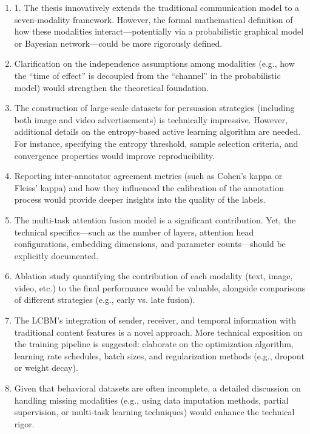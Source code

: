 
\begin{enumerate}
    \item 1. The thesis innovatively extends the traditional communication model to a seven-modality framework. However, the formal mathematical definition of how these modalities interact—potentially via a probabilistic graphical model or Bayesian network—could be more rigorously defined.

\item Clarification on the independence assumptions among modalities (e.g., how the “time of effect” is decoupled from the “channel” in the probabilistic model) would strengthen the theoretical foundation.

\item The construction of large-scale datasets for persuasion strategies (including both image and video advertisements) is technically impressive. However, additional details on the entropy-based active learning algorithm are needed. For instance, specifying the entropy threshold, sample selection criteria, and convergence properties would improve reproducibility.


\item Reporting inter-annotator agreement metrics (such as Cohen’s kappa or Fleiss’ kappa) and how they influenced the calibration of the annotation process would provide deeper insights into the quality of the labels.

\item The multi-task attention fusion model is a significant contribution. Yet, the technical specifics—such as the number of layers, attention head configurations, embedding dimensions, and parameter counts—should be explicitly documented.


\item Ablation study quantifying the contribution of each modality (text, image, video, etc.) to the final performance would be valuable, alongside comparisons of different strategies (e.g., early vs. late fusion).


\item The LCBM’s integration of sender, receiver, and temporal information with traditional content features is a novel approach. More technical exposition on the training pipeline is suggested: elaborate on the optimization algorithm, learning rate schedules, batch sizes, and regularization methods (e.g., dropout or weight decay).


\item Given that behavioral datasets are often incomplete, a detailed discussion on handling missing modalities (e.g., using data imputation methods, partial supervision, or multi-task learning techniques) would enhance the technical rigor.



\end{enumerate}

